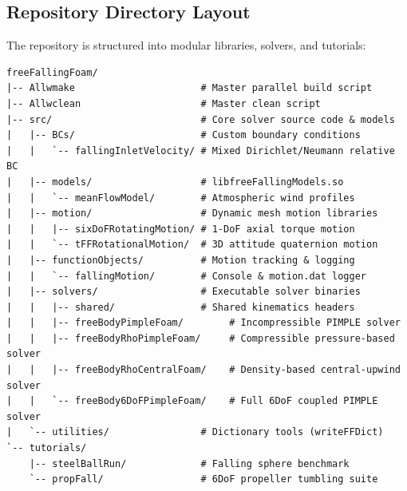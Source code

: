 \documentclass[11pt,a4paper]{article}
\begin{document}
\subsection{Repository Directory Layout}
The repository is structured into modular libraries, solvers, and tutorials:
\begin{verbatim}
freeFallingFoam/
|-- Allwmake                      # Master parallel build script
|-- Allwclean                     # Master clean script
|-- src/                          # Core solver source code & models
|   |-- BCs/                      # Custom boundary conditions
|   |   `-- fallingInletVelocity/ # Mixed Dirichlet/Neumann relative BC
|   |-- models/                   # libfreeFallingModels.so
|   |   `-- meanFlowModel/        # Atmospheric wind profiles
|   |-- motion/                   # Dynamic mesh motion libraries
|   |   |-- sixDoFRotatingMotion/ # 1-DoF axial torque motion
|   |   `-- tFFRotationalMotion/  # 3D attitude quaternion motion
|   |-- functionObjects/          # Motion tracking & logging
|   |   `-- fallingMotion/        # Console & motion.dat logger
|   |-- solvers/                  # Executable solver binaries
|   |   |-- shared/               # Shared kinematics headers
|   |   |-- freeBodyPimpleFoam/        # Incompressible PIMPLE solver
|   |   |-- freeBodyRhoPimpleFoam/     # Compressible pressure-based solver
|   |   |-- freeBodyRhoCentralFoam/    # Density-based central-upwind solver
|   |   `-- freeBody6DoFPimpleFoam/    # Full 6DoF coupled PIMPLE solver
|   `-- utilities/                # Dictionary tools (writeFFDict)
`-- tutorials/
    |-- steelBallRun/             # Falling sphere benchmark
    `-- propFall/                 # 6DoF propeller tumbling suite
\end{verbatim}
\end{document}
